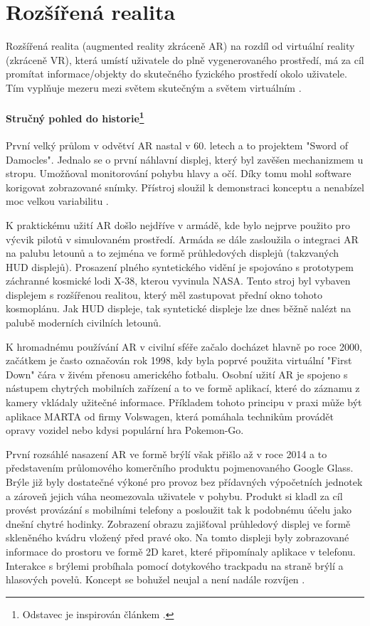 \chapter{Rozšířená realita}
Rozšířená realita (augmented reality zkráceně AR) na rozdíl od virtuální reality (zkráceně VR), která umístí uživatele do plně vygenerovaného prostředí, má za cíl promítat informace/objekty do skutečného fyzického prostředí okolo uživatele. Tím vyplňuje mezeru mezi světem skutečným a světem virtuálním  \cite{Kniha2SchmalstiegDieter2016Ar:p}. 

\subsubsection[Pohled do historie]{Stručný pohled do historie\footnote{Odstavec je inspirován článkem \cite{historyAr}.}}
 První velký průlom v odvětví AR nastal v 60. letech a to projektem "Sword of Damocles". Jednalo se o první náhlavní displej, který byl zavěšen mechanizmem u stropu. Umožňoval monitorování pohybu hlavy a očí. Díky tomu mohl software korigovat zobrazované snímky. Přístroj sloužil k demonstraci konceptu a nenabízel moc velkou variabilitu \cite{Kniha1GreengardSamuel2019Vr}.

K praktickému užití AR došlo nejdříve v armádě, kde bylo nejprve použito pro výcvik pilotů v simulovaném prostředí. Armáda se dále zasloužila o integraci AR na palubu letounů a to zejména ve formě průhledových displejů (takzvaných HUD displejů). Prosazení plného syntetického vidění je spojováno s prototypem záchranné kosmické lodi X-38, kterou vyvinula NASA. Tento stroj byl vybaven displejem s rozšířenou realitou, který měl zastupovat přední okno tohoto kosmoplánu\cite{delgado2001hybrid}. Jak HUD displeje, tak syntetické displeje lze dnes běžně nalézt na palubě moderních civilních letounů.

K hromadnému používání AR v civilní sféře začalo docházet hlavně po roce 2000, začátkem je často označován rok 1998, kdy byla poprvé použita virtuální "First Down" čára v živém přenosu amerického fotbalu. Osobní užití AR je spojeno s nástupem chytrých mobilních zařízení a to ve formě aplikací, které do záznamu z kamery vkládaly užitečné informace. Příkladem tohoto principu v praxi může být aplikace MARTA od firmy Volswagen, která pomáhala technikům provádět opravy vozidel \cite{MartaArt} nebo kdysi populární hra Pokemon-Go.

První rozsáhlé nasazení AR ve formě brýlí však přišlo až v roce 2014 a to představením průlomového komerčního produktu pojmenovaného Google Glass. Brýle již byly dostatečné výkoné pro provoz bez přídavných výpočetních jednotek a zároveň jejich váha neomezovala uživatele v pohybu.
Produkt si kladl za cíl provést provázání s mobilními telefony a posloužit tak k podobnému účelu jako dnešní chytré hodinky. Zobrazení obrazu zajišťoval průhledový displej ve formě skleněného kvádru vložený před pravé oko. Na tomto displeji byly zobrazované informace do prostoru ve formě 2D karet, které připomínaly aplikace v telefonu. Interakce s brýlemi probíhala pomocí dotykového trackpadu na straně brýlí a hlasových povelů. Koncept se bohužel neujal a není nadále rozvíjen \cite{GoogleGlass}.

